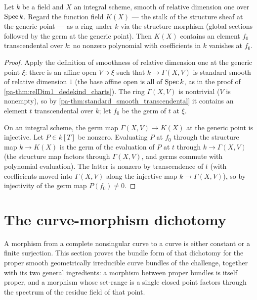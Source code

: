 \begin{theorem}
  \label{pa-thm:relDim1_transcendental}
  \leanok

  Let \(k\) be a field and \(X\) an integral scheme, smooth of relative dimension one over
  \(\operatorname{Spec} k\). Regard the function field \(K(X)\) --- the stalk of the structure sheaf at
  the generic point --- as a ring under \(k\) via the structure morphism (global sections
  followed by the germ at the generic point). Then \(K(X)\) contains an element \(f_0\)
  transcendental over \(k\): no nonzero polynomial with coefficients in \(k\) vanishes at
  \(f_0\).
\end{theorem}
\begin{proof}
  \leanok
  Apply the definition of smoothness of relative dimension one at the generic point
  \(\xi\): there is an affine open \(V \ni \xi\) such that \(k \to \Gamma(X, V)\) is
  standard smooth of relative dimension \(1\) (the base affine open is all of \(\operatorname{Spec} k\),
  as in the proof of \ref{pa-thm:relDim1_dedekind_charts}). The ring \(\Gamma(X, V)\) is
  nontrivial (\(V\) is nonempty), so by \ref{pa-thm:standard_smooth_transcendental} it
  contains an element \(t\) transcendental over \(k\); let \(f_0\) be the germ of \(t\) at
  \(\xi\).

  On an integral scheme, the germ map \(\Gamma(X, V) \to K(X)\) at the generic point is
  injective. Let \(P \in k[T]\) be nonzero. Evaluating \(P\) at \(f_0\) through the
  structure map \(k \to K(X)\) is the germ of the evaluation of \(P\) at \(t\) through
  \(k \to \Gamma(X, V)\) (the structure map factors through \(\Gamma(X, V)\), and germs
  commute with polynomial evaluation). The latter is nonzero by transcendence of \(t\)
  (with coefficients moved into \(\Gamma(X, V)\) along the injective map \(k \to
  \Gamma(X, V)\)), so by injectivity of the germ map \(P(f_0) \neq 0\).
\end{proof}

\section{The curve-morphism dichotomy}
\label{pa-sec:curve_morphism_dichotomy}

A morphism from a complete nonsingular curve to a curve is either constant or a finite
surjection. This section proves the bundle form of that dichotomy for the proper smooth
geometrically irreducible curve bundles of the challenge, together with its two general
ingredients: a morphism between proper bundles is itself proper, and a morphism whose
set-range is a single closed point factors through the spectrum of the residue field of
that point.

